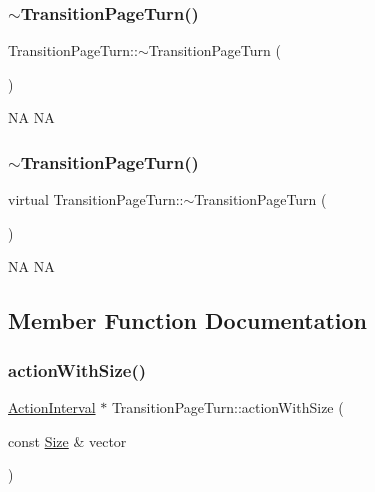 \subsubsection{\texorpdfstring{$\sim$\+Transition\+Page\+Turn()}{~TransitionPageTurn()}\hspace{0.1cm}{\footnotesize\ttfamily [1/2]}}
{\footnotesize\ttfamily Transition\+Page\+Turn\+::$\sim$\+Transition\+Page\+Turn (\begin{DoxyParamCaption}{ }\end{DoxyParamCaption})\hspace{0.3cm}{\ttfamily [virtual]}}

NA  NA \mbox{\label{classTransitionPageTurn_a2777c035a3ef06027a0f5167d0d16c52}} 
\subsubsection{\texorpdfstring{$\sim$\+Transition\+Page\+Turn()}{~TransitionPageTurn()}\hspace{0.1cm}{\footnotesize\ttfamily [2/2]}}
{\footnotesize\ttfamily virtual Transition\+Page\+Turn\+::$\sim$\+Transition\+Page\+Turn (\begin{DoxyParamCaption}{ }\end{DoxyParamCaption})\hspace{0.3cm}{\ttfamily [virtual]}}

NA  NA 

\subsection{Member Function Documentation}
\mbox{\label{classTransitionPageTurn_a5de2062024b8a0dc293d1e4d7b2d8d2a}} 
\subsubsection{\texorpdfstring{action\+With\+Size()}{actionWithSize()}\hspace{0.1cm}{\footnotesize\ttfamily [1/2]}}
{\footnotesize\ttfamily \hyperlink{classActionInterval}{Action\+Interval} $\ast$ Transition\+Page\+Turn\+::action\+With\+Size (\begin{DoxyParamCaption}\item[{const \hyperlink{classSize}{Size} \&}]{vector }\end{DoxyParamCaption})}

